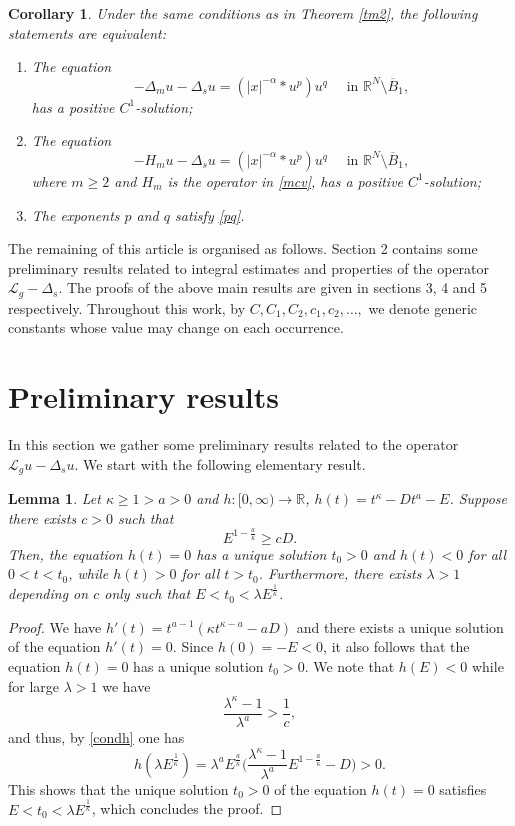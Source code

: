 \documentclass[leqno,12pt]{article}
\numberwithin{equation}{section}
\newcommand{\R}{\mathbb R}
\newcommand{\Lg}{{\mathcal L}_g}
\newtheorem{corollary}[theorem]{Corollary}
\newtheorem{lemma}[theorem]{Lemma}
\begin{document}
\begin{corollary}\label{cor1}
Under the same conditions as in Theorem \ref{tm2}, the following statements are equivalent:
\begin{enumerate}
\item[(i)] The equation 
$$
-\Delta_m u-\Delta_s u=(|x|^{-\alpha}*u^p)u^q \quad\mbox{ in }\R^N\setminus \overline B_1,
$$
has a positive $C^1$-solution;
\item[(ii)] The equation 
$$
-H_m u-\Delta_s u=(|x|^{-\alpha}*u^p)u^q \quad\mbox{ in }\R^N\setminus \overline B_1,
$$
where $m\geq 2$ and $H_m$ is the operator in \eqref{mcv}, 
has a positive $C^1$-solution;
\item[(iii)] The exponents $p$ and $q$ satisfy \eqref{pq}. 
\end{enumerate}

\end{corollary}

The remaining of this article is organised as follows. Section 2 contains some preliminary results related to integral estimates and properties of the operator $\Lg-\Delta_s$. The proofs of the above main results are given in sections 3, 4 and 5 respectively. Throughout this work, by $C, C_1, C_2, c_1, c_2, \dots, $ we denote generic constants whose value may change on each occurrence. 

\section{Preliminary results}

In this section we gather some preliminary results related to the operator $\Lg u-\Delta_s u$. We start with the following elementary result. 
\begin{lemma}\label{lh}
Let $\kappa\geq 1>a>0$ and $h:[0, \infty)\to \R$, $h(t)=t^\kappa-Dt^a-E$. Suppose there exists $c>0$ such that 
\begin{equation}\label{condh}
E^{1-\frac{a}{\kappa}}\geq cD.
\end{equation}
Then, the equation $h(t)=0$ has a unique solution $t_0>0$ and $h(t)<0$ for all $0<t<t_0$, while $h(t)>0$ for all $t>t_0$. Furthermore, there exists $\lambda>1$ depending on $c$ only such that $E<t_0<\lambda E^{\frac{1}{\kappa}}$.
\end{lemma}
\begin{proof}
We have $h'(t)=t^{a-1}(\kappa t^{\kappa-a}-aD)$ and there exists a unique solution of the equation $h'(t)=0$. Since $h(0)=-E<0$, it also follows that the equation $h(t)=0$ has a unique solution $t_0>0$. We note that $h(E)<0$ while for large $\lambda>1$ we have
$$
\frac{\lambda^\kappa-1}{\lambda^a}>\frac{1}{c},$$
and thus, by \eqref{condh} one has
$$
h(\lambda E^{\frac{1}{\kappa}})=\lambda^a E^{\frac{a}{\kappa}} \Big(\frac{\lambda^\kappa-1}{\lambda^a}E^{1-\frac{a}{\kappa}}-D  \Big)>0.
$$
This shows that the unique solution $t_0>0$ of the equation $h(t)=0$ satisfies $E<t_0<\lambda E^{\frac{1}{\kappa}}$, which concludes the proof.
\end{proof}
\end{document}
